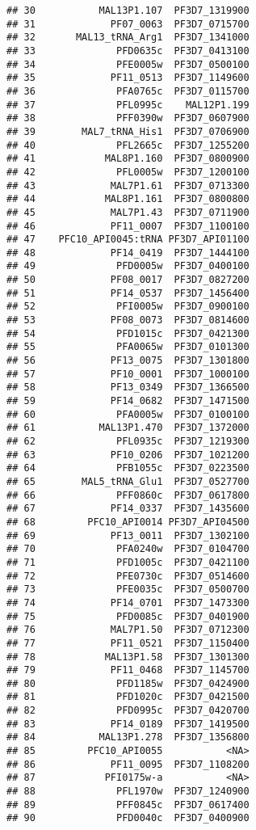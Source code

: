\documentclass[12pt, a4paper]{article}\usepackage[]{graphicx}\usepackage[]{color}
\makeatletter
\newenvironment{kframe}{%
 \def\at@end@of@kframe{}%
 \ifinner\ifhmode%
  \def\at@end@of@kframe{\end{minipage}}%
  \begin{minipage}{\columnwidth}%
 \fi\fi%
 \def\FrameCommand##1{\hskip\@totalleftmargin \hskip-\fboxsep
 \colorbox{shadecolor}{##1}\hskip-\fboxsep
     \hskip-\linewidth \hskip-\@totalleftmargin \hskip\columnwidth}%
 \MakeFramed {\advance\hsize-\width
   \@totalleftmargin\z@ \linewidth\hsize
   \@setminipage}}%
 {\par\unskip\endMakeFramed%
 \at@end@of@kframe}
\newenvironment{knitrout}{}{} %
\makeatother
\begin{document}
\begin{knitrout}
\begin{kframe}
\begin{verbatim}
## 30           MAL13P1.107  PF3D7_1319900
## 31             PF07_0063  PF3D7_0715700
## 32       MAL13_tRNA_Arg1  PF3D7_1341000
## 33              PFD0635c  PF3D7_0413100
## 34              PFE0005w  PF3D7_0500100
## 35             PF11_0513  PF3D7_1149600
## 36              PFA0765c  PF3D7_0115700
## 37              PFL0995c    MAL12P1.199
## 38              PFF0390w  PF3D7_0607900
## 39        MAL7_tRNA_His1  PF3D7_0706900
## 40              PFL2665c  PF3D7_1255200
## 41            MAL8P1.160  PF3D7_0800900
## 42              PFL0005w  PF3D7_1200100
## 43             MAL7P1.61  PF3D7_0713300
## 44            MAL8P1.161  PF3D7_0800800
## 45             MAL7P1.43  PF3D7_0711900
## 46             PF11_0007  PF3D7_1100100
## 47    PFC10_API0045:tRNA PF3D7_API01100
## 48             PF14_0419  PF3D7_1444100
## 49              PFD0005w  PF3D7_0400100
## 50             PF08_0017  PF3D7_0827200
## 51             PF14_0537  PF3D7_1456400
## 52              PFI0005w  PF3D7_0900100
## 53             PF08_0073  PF3D7_0814600
## 54              PFD1015c  PF3D7_0421300
## 55              PFA0065w  PF3D7_0101300
## 56             PF13_0075  PF3D7_1301800
## 57             PF10_0001  PF3D7_1000100
## 58             PF13_0349  PF3D7_1366500
## 59             PF14_0682  PF3D7_1471500
## 60              PFA0005w  PF3D7_0100100
## 61           MAL13P1.470  PF3D7_1372000
## 62              PFL0935c  PF3D7_1219300
## 63             PF10_0206  PF3D7_1021200
## 64              PFB1055c  PF3D7_0223500
## 65        MAL5_tRNA_Glu1  PF3D7_0527700
## 66              PFF0860c  PF3D7_0617800
## 67             PF14_0337  PF3D7_1435600
## 68         PFC10_API0014 PF3D7_API04500
## 69             PF13_0011  PF3D7_1302100
## 70              PFA0240w  PF3D7_0104700
## 71              PFD1005c  PF3D7_0421100
## 72              PFE0730c  PF3D7_0514600
## 73              PFE0035c  PF3D7_0500700
## 74             PF14_0701  PF3D7_1473300
## 75              PFD0085c  PF3D7_0401900
## 76             MAL7P1.50  PF3D7_0712300
## 77             PF11_0521  PF3D7_1150400
## 78            MAL13P1.58  PF3D7_1301300
## 79             PF11_0468  PF3D7_1145700
## 80              PFD1185w  PF3D7_0424900
## 81              PFD1020c  PF3D7_0421500
## 82              PFD0995c  PF3D7_0420700
## 83             PF14_0189  PF3D7_1419500
## 84           MAL13P1.278  PF3D7_1356800
## 85         PFC10_API0055           <NA>
## 86             PF11_0095  PF3D7_1108200
## 87            PFI0175w-a           <NA>
## 88              PFL1970w  PF3D7_1240900
## 89              PFF0845c  PF3D7_0617400
## 90              PFD0040c  PF3D7_0400900

\end{verbatim}
\end{kframe}
\end{knitrout}
\end{document}
